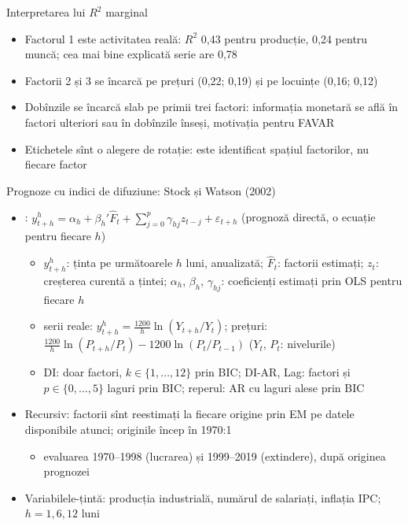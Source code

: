 \begin{frame}{Interpretarea lui $R^2$ marginal}
\itemsize{\small}
\begin{itemize}
    \item Factorul 1 este activitatea reală: $R^2$ 0{,}43 pentru producție, 0{,}24 pentru muncă; cea mai bine explicată serie are 0{,}78
    \item Factorii 2 și 3 se încarcă pe prețuri (0{,}22; 0{,}19) și pe locuințe (0{,}16; 0{,}12)
    \item Dobînzile se încarcă slab pe primii trei factori: informația monetară se află în factori ulteriori sau în dobînzile înseși, motivația pentru FAVAR
    \item Etichetele sînt o alegere de rotație: este identificat spațiul factorilor, nu fiecare factor
\end{itemize}
\end{frame}

\begin{frame}{Prognoze cu indici de difuziune: Stock și Watson (2002)}
\itemsize{\small}
\begin{itemize}
    \item {}: $y_{t+h}^h = \alpha_h + \beta_h'\hat F_t + \sum_{j=0}^{p}\gamma_{hj}z_{t-j} + \varepsilon_{t+h}$ (prognoză directă, o ecuație pentru fiecare $h$)
    \begin{itemize}
        \item $y_{t+h}^h$: ținta pe următoarele $h$ luni, anualizată; $\hat F_t$: factorii estimați; $z_t$: creșterea curentă a țintei; $\alpha_h$, $\beta_h$, $\gamma_{hj}$: coeficienți estimați prin OLS pentru fiecare $h$
        \item serii reale: $y_{t+h}^h = \frac{1200}{h}\ln(Y_{t+h}/Y_t)$; prețuri: $\frac{1200}{h}\ln(P_{t+h}/P_t) - 1200\ln(P_t/P_{t-1})$ ($Y_t$, $P_t$: nivelurile)
        \item DI: doar factori, $k \in \{1, \dots, 12\}$ prin BIC; DI-AR, Lag: factori și $p \in \{0, \dots, 5\}$ laguri prin BIC; reperul: AR cu laguri alese prin BIC
    \end{itemize}
    \item Recursiv: factorii sînt reestimați la fiecare origine prin EM pe datele disponibile atunci; originile încep în 1970:1
    \begin{itemize}
        \item evaluarea 1970--1998 (lucrarea) și 1999--2019 (extindere), după originea prognozei
    \end{itemize}
    \item Variabilele-țintă: producția industrială, numărul de salariați, inflația IPC; $h = 1, 6, 12$ luni
\end{itemize}
\end{frame}

